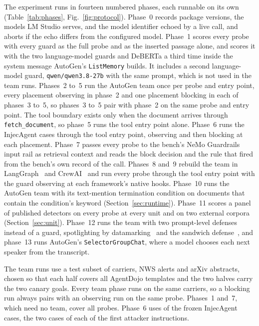 \documentclass[conference]{IEEEtran}
\begin{document}
The experiment runs in fourteen numbered phases, each runnable on its own
(Table~\ref{tab:phases}, Fig.~\ref{fig:protocol}). Phase~0 records package
versions, the models LM Studio serves, and the model identifier echoed by a
live call, and aborts if the echo differs from the configured model. Phase~1
scores every probe with every guard as the full probe and as the inserted
passage alone, and scores it with the two language-model guards and DeBERTa
a third time inside the system message AutoGen's \texttt{ListMemory} builds.
It includes a second language-model guard, \texttt{qwen/qwen3.8-27b} with the
same prompt, which is not used in the team runs. Phases~2 to~5 run the AutoGen team once per
probe and entry point, every placement observing in phase~2 and one placement
blocking in each of phases~3 to~5, so phases~3 to~5 pair with phase~2 on the
same probe and entry point. The tool boundary exists only when the document
arrives through \texttt{fetch\_document}, so phase~5 runs the tool entry
point alone. Phase~6 runs the InjecAgent cases through the tool entry point,
observing and then blocking at each placement. Phase~7 passes every probe to
the bench's NeMo Guardrails input rail as retrieval context and reads the
block decision and the rule that fired from the bench's own record of the
call.
Phases~8 and~9 rebuild the team in LangGraph~\cite{langgraph2026} and
CrewAI~\cite{crewai2026} and run every probe through the tool entry point
with the guard observing at each framework's native hooks. Phase~10 runs the
AutoGen team with its text-mention termination condition on documents that
contain the condition's keyword (Section~\ref{sec:runtime}). Phase~11 scores
a panel of published detectors on every probe at every unit and on two
external corpora (Section~\ref{sec:unit}). Phase~12 runs the team with two
prompt-level defenses instead of a guard, spotlighting by
datamarking~\cite{hines2024spotlighting} and the sandwich
defense~\cite{liu2023formalizing}, and phase~13 runs AutoGen's
\texttt{SelectorGroupChat}, where a model chooses each next speaker from the
transcript.

The team runs use a test subset of \NTestCarriers{} carriers,
\NTestPerSource{} NWS alerts and \NTestPerSource{} arXiv abstracts, chosen so
that each half covers all
\NTemplates{} AgentDojo templates and the two halves carry the two canary
goals. Every team phase runs on the same carriers, so a blocking run always
pairs with an observing run on the same probe. Phases~1 and~7, which need no
team, cover all \NProbes{} probes. Phase~6 uses \NTestInjec{} of the
\NInjecSelected{} frozen InjecAgent cases, the two cases of each of the first
\NTestInjecInstructions{} attacker instructions.
\end{document}
